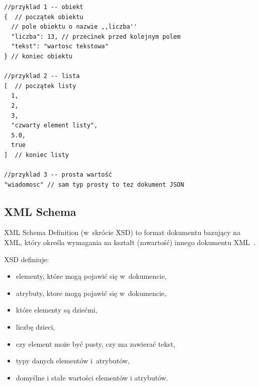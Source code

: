 \begin{lstlisting}[float, frame=single, caption={Przykłady JSON. Komentarze poprzedzone przez ,,//'', mimo, że składnia JSON nie posiada komentarzy.}, label=kod:json-example]
//przyklad 1 -- obiekt
{  // początek obiektu
  // pole obiektu o nazwie ,,liczba''
  "liczba": 13, // przecinek przed kolejnym polem
  "tekst": "wartosc tekstowa"
} // koniec obiektu

//przyklad 2 -- lista
[  // początek listy
  1,
  2,
  3,
  "czwarty element listy",
  5.0,
  true
]  // koniec listy

//przyklad 3 -- prosta wartość
"wiadomosc" // sam typ prosty to tez dokument JSON
\end{lstlisting}

%
%

%


\subsection{XML Schema}
XML Schema Definition (w~skrócie XSD) to format dokumentu bazujący na XML, który określa wymagania na kształt (zawartość) innego dokumentu XML~\cite{xml-schema-tutorial}.

XSD definiuje:
\begin{itemize}
	\item elementy, które mogą pojawić się w~dokumencie,
	\item atrybuty, ktore mogą pojawić się w~dokumencie,
	\item które elementy są dziećmi,
	\item liczbę dzieci,
	\item czy element może być pusty, czy ma zawierać tekst,
	\item typy danych elementów i~atrybutów,
	\item domyślne i stałe wartości elementów i atrybutów.
\end{itemize}

